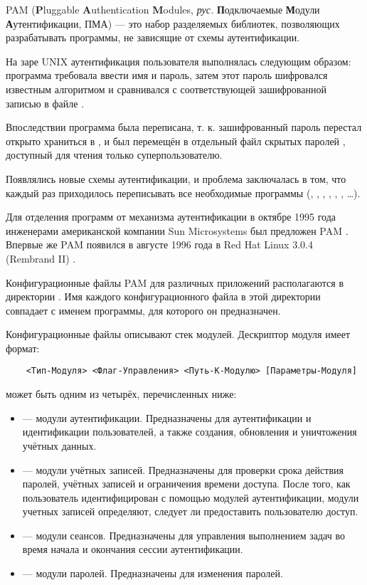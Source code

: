 PAM (\textbf{P}luggable \textbf{A}uthentication \textbf{M}odules, \textit{рус.} \textbf{П}одключаемые \textbf{М}одули \textbf{А}утентификации, ПМА) — это набор разделяемых библиотек, позволяющих разрабатывать программы, не зависящие от схемы аутентификации.

На заре UNIX аутентификация пользователя выполнялась следующим образом: программа  требовала ввести имя и пароль, затем этот пароль шифровался известным алгоритмом и сравнивался с соответствующей зашифрованной записью в файле .

Впоследствии программа  была переписана, т. к. зашифрованный пароль перестал открыто храниться в , и был перемещён в отдельный файл скрытых паролей , доступный для чтения только суперпользователю.

Появлялись новые схемы аутентификации, и проблема заключалась в том, что каждый раз приходилось переписывать все необходимые программы (, , , , , , \ldots).

Для отделения программ от механизма аутентификации в октябре 1995 года инженерами американской компании Sun Microsystems был предложен PAM \cite{rfc-86.0}. Впервые же PAM появился в августе 1996 года в Red Hat Linux 3.0.4 (Rembrand II) \cite{red-hat-linux-3.0.4}.

Конфигурационные файлы PAM для различных приложений располагаются в директории .
Имя каждого конфигурационного файла в этой директории совпадает с именем программы, для которого он предназначен.

Конфигурационные файлы описывают стек модулей.
Дескриптор модуля имеет формат:
\begin{verbatim}
	<Тип-Модуля> <Флаг-Управления> <Путь-К-Модулю> [Параметры-Модуля]
\end{verbatim}

 может быть одним из четырёх, перечисленных ниже:
\begin{itemize}
	\item {} — модули аутентификации.
	Предназначены для аутентификации и идентификации пользователей, а также создания, обновления и уничтожения учётных данных.
	\item {} — модули учётных записей.
	Предназначены для проверки срока действия паролей, учётных записей и ограничения времени доступа.
	После того, как пользователь идентифицирован с помощью модулей аутентификации, модули учетных записей определяют, следует ли предоставить пользователю доступ.
	\item {} — модули сеансов.
	Предназначены для управления выполнением задач во время начала и окончания сессии аутентификации.
	\item {} — модули паролей.
	Предназначены для изменения паролей.
\end{itemize}

